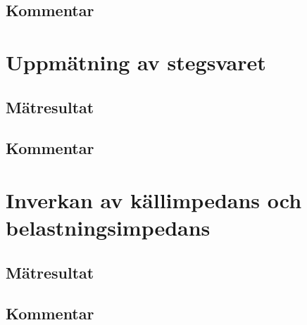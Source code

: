 \documentclass[11pt,a4paper]{article}
\begin{document}
\subsection{Kommentar}\label{}


\section{Uppmätning av stegsvaret}\label{}

\subsection{Mätresultat}\label{}

\subsection{Kommentar}\label{}


\section{Inverkan av källimpedans och belastningsimpedans}\label{}

\subsection{Mätresultat}\label{}

\subsection{Kommentar}\label{}
\end{document}
